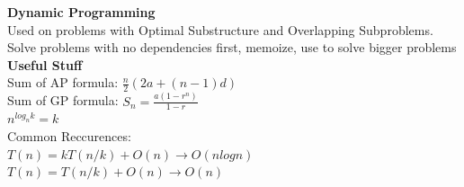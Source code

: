 \documentclass[10pt, a4paper]{article}
\begin{document}
\begin{multicols*}{3}
		{\normalsize\textbf{Dynamic Programming}}\\
		Used on problems with Optimal Substructure and Overlapping Subproblems.
		Solve problems with no dependencies first, memoize, use to solve bigger problems\\
		
		{\normalsize\textbf{Useful Stuff}}\\
		Sum of AP formula: $\frac{n}{2}(2a + (n - 1)d)$\\
		Sum of GP formula: $S_n = \frac{a(1 - r^n)}{1 - r}$\\
		$n^{log_{n}k} = k$\\
		
		Common Reccurences:\\
		$T(n) = kT(n/k) + O(n) \rightarrow O(nlogn)$\\
		$T(n) = T(n/k) + O(n) \rightarrow O(n)$\\
		
	\end{multicols*}
\end{document}
